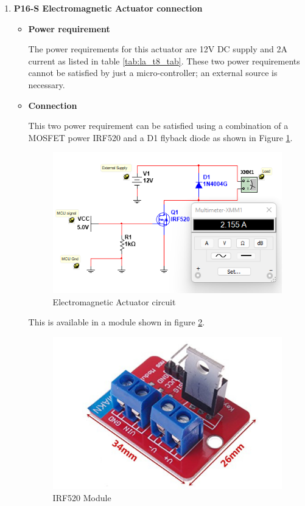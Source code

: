 \begin{enumerate}
    \item \textbf{P16-S Electromagnetic Actuator connection}
    \par
    \begin{itemize}
        \item \textbf{Power requirement}
        \par
        The power requirements for this actuator are 12V DC supply and 2A current as listed in table \ref{tab:la_t8_tab}. These two power requirements cannot be satisfied by just a micro-controller; an external source is necessary.
        \item \textbf{Connection}
        \par
        This two power requirement can be satisfied using a combination of a MOSFET power IRF520 and a D1 flyback diode as shown in Figure \ref{fig:electromagnet_connection}.
        \begin{figure}[H]
            \centering
            \includegraphics{Figures/ElectromagnetConnection.png}
            \caption{Electromagnetic Actuator circuit}
            \label{fig:electromagnet_connection}
        \end{figure}
        This is available in a module shown in figure \ref{fig:irf520_module}.
        \begin{figure}[H]
            \centering
            \includegraphics[width=.25\textwidth,height=.25\textheight]{Figures/IRF520Module.jpg}
            \caption[IRF520 Module]{IRF520 Module \cite{irf520}}
            \label{fig:irf520_module}
        \end{figure}
    \end{itemize}
\end{enumerate}
